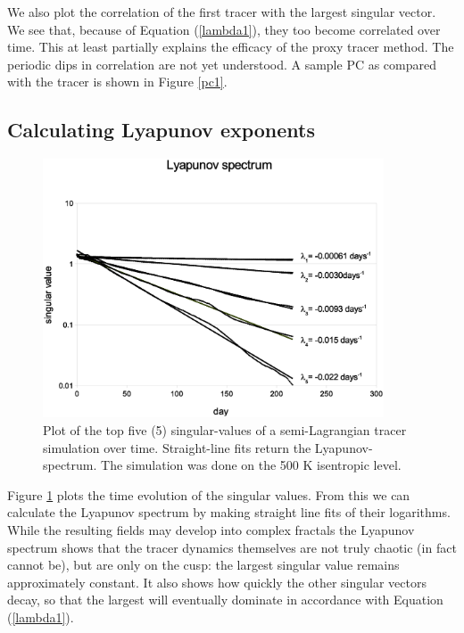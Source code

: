 We also plot the correlation of the first tracer with the largest singular
vector.  
We see that, because of Equation (\ref{lambda1}), they too become
correlated over time.
This at least partially explains the efficacy of the proxy tracer method.
The periodic dips in correlation are not yet understood.
A sample PC as compared with the tracer is shown in Figure \ref{pc1}.  

\subsection{Calculating Lyapunov exponents}

\label{Lyapunov_exponents}

\begin{figure}
\begin{center}
\includegraphics[width=0.9\textwidth]{lyap_spec}
\caption{Plot of the top five (5) singular-values of a semi-Lagrangian
tracer simulation over time.  Straight-line fits return the Lyapunov-spectrum.
The simulation was done on the 500 K isentropic level.}
\label{lyap_spec}
\end{center}
\end{figure}

Figure \ref{lyap_spec} plots the time evolution of the singular values.
From this we can calculate the Lyapunov spectrum by making straight line
fits of their logarithms.
While the resulting fields may develop into complex fractals \citep{Mills2009}
the Lyapunov spectrum shows that the tracer dynamics themselves 
are not truly chaotic (in fact cannot be), but are
only on the cusp: the largest singular value remains approximately constant.
It also shows how quickly the other singular vectors decay,
so that the largest will eventually dominate in accordance with
Equation (\ref{lambda1}).

